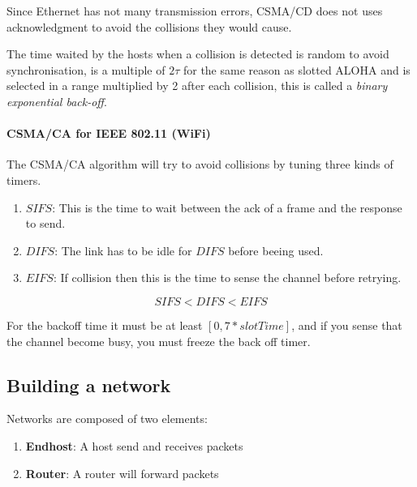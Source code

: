 Since Ethernet has not many transmission errors, CSMA/CD does not uses acknowledgment to avoid the collisions they would cause.

The time waited by the hosts when a collision is detected is random to avoid synchronisation,
is a multiple of $2\tau$ for the same reason as slotted ALOHA and is selected in a range multiplied by 2 after each collision,
this is called a \emph{binary exponential back-off}.

\paragraph{CSMA/CA for IEEE 802.11 (WiFi)}

The CSMA/CA algorithm will try to avoid collisions by tuning three kinds of timers.

\begin{enumerate}
  \item $SIFS$: This is the time to wait between the ack of a frame and the response to send.
  \item $DIFS$: The link has to be idle for $DIFS$ before beeing used.
  \item $EIFS$: If collision then this is the time to sense the channel before retrying.
\end{enumerate}

$$SIFS < DIFS < EIFS$$

For the backoff time it must be at least $[0, 7*slotTime]$, and if you sense that the channel become busy, you must freeze the back off timer.

%
%



\subsection{Building a network}

Networks are composed of two elements:
\begin{enumerate}
\item \textbf{Endhost}: A host send and receives packets
\item \textbf{Router}: A router will forward packets
\end{enumerate}

